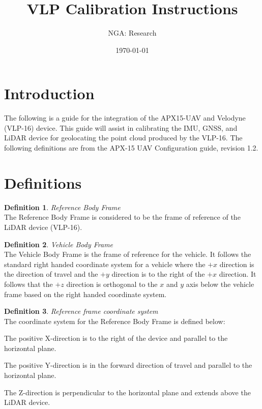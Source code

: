 \documentclass[11pt]{article}
\theoremstyle{definition}
\newtheorem{defn}{Definition}[section]
\begin{document}
	\title{VLP Calibration Instructions}
	
	\author{NGA: Research}
	\date{\today}
	\maketitle
	\thispagestyle{fancy}
	
	\section{Introduction}\label{sec:intro}
	The following is a guide for the integration of the APX15-UAV and Velodyne (VLP-16) device.  This guide will assist in calibrating the IMU, GNSS, and LiDAR device for geolocating the point cloud produced by the VLP-16.  The following definitions are from the APX-15 UAV Configuration guide, revision 1.2. 
	
	\section{Definitions} \label{sec:def}
	
	\begin{defn}\label{def:reference_frame}
		\textit{Reference Body Frame}\\
		The Reference Body Frame is considered to be the frame of reference of the LiDAR device (VLP-16).
	\end{defn}
	
	\begin{defn}\label{def:vehicle_body_frame}
		\textit{Vehicle Body Frame}\\
		The Vehicle Body Frame is the frame of reference for the vehicle.  It follows the standard right handed coordinate system for a vehicle where the $+x$ direction is the direction of travel and the $+y$ direction is to the right of the $+x$ direction.  It follows that the $+z$ direction is orthogonal to the $x$ and $y$ axis below the vehicle frame based on the right handed coordinate system. 
	\end{defn}
	
	
	\begin{defn}\label{def:coord}
		\textit{Reference frame coordinate system}\\
		The coordinate system for the Reference Body Frame is defined below:\par
		  The positive X-direction is to the right of the device and parallel to the horizontal plane.\par
		  The positive Y-direction is in the forward direction of travel and parallel to the horizontal plane.\par
		  The Z-direction is perpendicular to the horizontal plane and extends above the LiDAR device.\par
		
		
	\end{defn}
	
\end{document}
